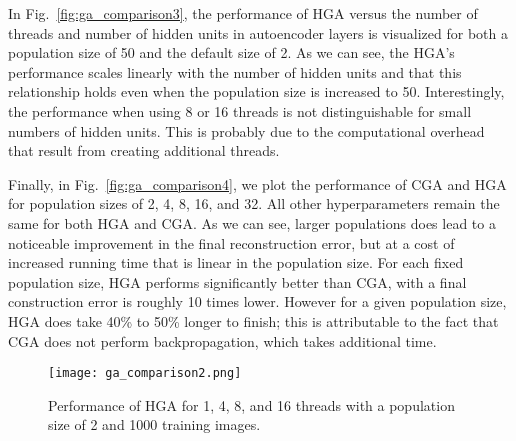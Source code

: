 In Fig.~\ref{fig:ga_comparison3}, the performance of HGA versus the number of threads and number of hidden units in autoencoder layers is visualized for both a population size of 50 and the default size of 2. As we can see, the HGA's performance scales linearly with the number of hidden units and that this relationship holds even when the population size is increased to 50. Interestingly, the performance when using 8 or 16 threads is not distinguishable for small numbers of hidden units. This is probably due to the computational overhead that result from creating additional threads.

Finally, in Fig.~\ref{fig:ga_comparison4}, we plot the performance of CGA and HGA for population sizes of 2, 4, 8, 16, and 32. All other hyperparameters remain the same for both HGA and CGA. As we can see, larger populations does lead to a noticeable improvement in the final reconstruction error, but at a cost of increased running time that is linear in the population size. For each fixed population size, HGA performs significantly better than CGA, with a final construction error is roughly 10 times lower. However for a given population size, HGA does take 40\% to 50\% longer to finish; this is attributable to the fact that CGA does not perform backpropagation, which takes additional time. 

\begin{figure}[h] \centering
  \texttt{[image: ga\_comparison2.png]}
  \caption{Performance of HGA for 1, 4, 8, and 16 threads with a population size of 2 and 1000 training images.}
  \label{fig:ga_comparison2}
\end{figure}

\begin{figure*}[h]
  \centering
  \caption{Comparison of performance versus number of threads and number of hidden units in autoencoder layer for HGA with population size (a) 2 and (b) 50.}
  \label{fig:ga_comparison3}
\end{figure*}

\begin{figure*}[h]
  \centering
  \caption{Comparison of performance for CGA and HGA with population sizes of 2, 4, 8, 16, and 32. HGA performs significantly better than CGA in terms of final reconstruction error.}
  \label{fig:ga_comparison4}
\end{figure*}

\FloatBarrier
